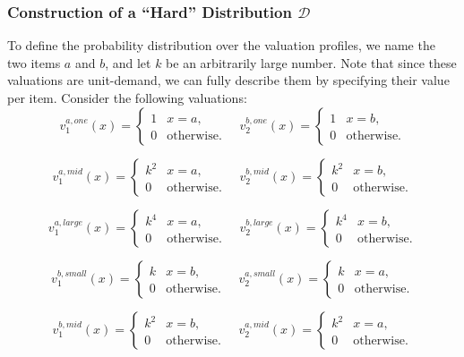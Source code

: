 \subsubsection[Construction of a ``Hard'' Distribution D]{Construction of a ``Hard'' Distribution $\mathcal{D}$}\label{subsubsec-description-ud}
    To define the probability distribution over the valuation profiles, we name the two items $a$ and $b$, and let $k$ be an arbitrarily large number. Note that since these valuations are unit-demand, we can fully describe them by specifying their value per item.
    Consider the following valuations:  
\[
v_1^{{a,one}}(x) = 
\begin{cases}
1 & x=a,\\
0 & \text{otherwise.}
\end{cases} \quad 
v_2^{{b,one}}(x) = 
\begin{cases}
1 & x=b,\\
0 & \text{otherwise.}
\end{cases}
\]

\[
v_1^{{a,mid}}(x) = 
\begin{cases}
k^2 & x=a,\\
0 & \text{otherwise.}
\end{cases} \quad 
v_2^{{b,mid}}(x) = 
\begin{cases}
k^2 & x=b,\\
0 & \text{otherwise.}
\end{cases}
\]

\[
v_1^{{a,large}}(x) = 
\begin{cases}
k^4 & x=a,\\
0 & \text{otherwise.}
\end{cases} \quad 
v_2^{{b,large}}(x) = 
\begin{cases}
k^4 & x=b,\\
0 & \text{otherwise.}
\end{cases}
\]

\[
v_1^{{b,small}}(x) = 
\begin{cases}
k & x=b,\\
0 & \text{otherwise.}
\end{cases} \quad 
v_2^{{a,small}}(x) = 
\begin{cases}
k & x=a,\\
0 & \text{otherwise.}
\end{cases}
\]

\[
v_1^{{b,mid}}(x) = 
\begin{cases}
k^2 & x=b,\\
0 & \text{otherwise.}
\end{cases} \quad 
v_2^{{a,mid}}(x) = 
\begin{cases}
k^2 & x=a,\\
0 & \text{otherwise.}
\end{cases}
\]

